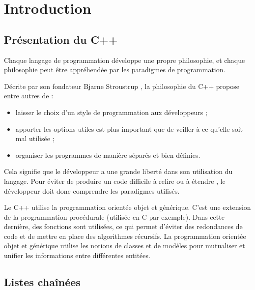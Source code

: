 \documentclass[conference]{IEEEtran}
\begin{document}




\section{Introduction}
\label{sec:intro}

\subsection{Présentation du C++}

Chaque langage de programmation développe une propre philosophie, et chaque philosophie peut être appréhendée par les paradigmes de programmation.

Décrite par son fondateur Bjarne Stroustrup \cite{stroustrup}, la philosophie du C++ propose entre autres de :
\begin{itemize}
    \item laisser le choix d'un style de programmation aux développeurs ;
    \item apporter les options utiles est plus important que de veiller à ce qu'elle soit mal utilisée ;
    \item organiser les programmes de manière séparés et bien définies.
\end{itemize}
Cela signifie que le développeur a une grande liberté dans son utilisation du langage. Pour éviter de produire un code difficile à relire ou à étendre \cite{stroustrup2}, le développeur doit donc comprendre les paradigmes utilisés.

Le C++ utilise la programmation orientée objet et générique. C'est une extension de la programmation procédurale (utilisée en C par exemple). Dans cette dernière, des fonctions sont utilisées, ce qui permet d'éviter des redondances de code et de mettre en place des algorithmes récursifs.
La programmation orientée objet et générique utilise les notions de classes et de modèles pour mutualiser et unifier les informations entre différentes entitées.


\subsection{Listes chaînées}
\end{document}
